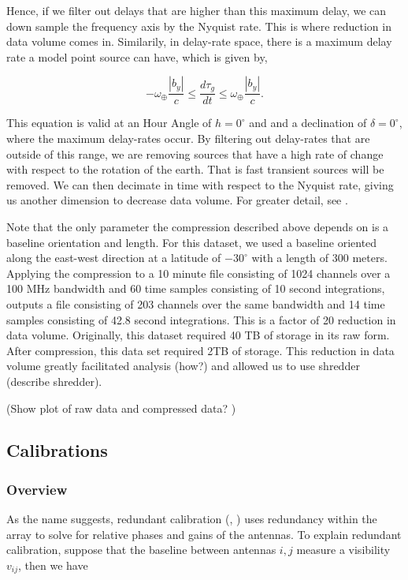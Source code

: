 \documentclass[twocolumn,numberedappendix]{emulateapj}
\begin{document}
Hence, if we filter out delays that are higher than this maximum delay, we can
down sample the frequency axis by the Nyquist rate. This is where reduction in
data volume comes in.  Similarily, in delay-rate space, there is a maximum
delay rate a model point source can have, which is given by, 

\begin{equation}
    -\omega_{\oplus}\frac{|b_{y}|}{c} \leq \frac{d\tau_{g}}{dt} 
                                     \leq \omega_{\oplus}\frac{|b_{y}|}{c}.
\end{equation}

This equation is valid at an Hour Angle of $h = 0^{\circ}$ and and a declination
of $\delta = 0^{\circ}$, where the maximum delay-rates occur. 
By filtering out delay-rates that are outside of this range, we are removing
sources that have a high rate of change with respect to the rotation of the
earth. That is fast transient sources will be removed. We can then decimate in
time with respect to the Nyquist rate, giving us another dimension to decrease
data volume. For greater detail, see \cite{parsons2014a}.

Note that the only parameter the compression described above depends on is a baseline
orientation and length. For this dataset, we used a baseline oriented along the
east-west direction at a latitude of $-30^{\circ}$ with a length of
300 meters.
Applying the compression to a 10 minute file consisting of 1024 channels over a
100 MHz bandwidth and 60 time samples consisting of 
10 second integrations, outputs a file consisting of 203 channels over the same
bandwidth and 14 time samples consisting of 42.8 second integrations. This is a
factor of 20 reduction in data volume. Originally, this dataset required 40 TB
of storage in its raw form. After compression, this data set required 2TB of
storage. This reduction in data volume greatly facilitated analysis (how?) and
allowed us to use shredder (describe shredder).

(Show plot of raw data and compressed data? )


\subsection{Calibrations}
\subsubsection{Overview}
As the name suggests, redundant calibration (\cite{liu_et_al2010},
\cite{zheng_et_al2014}) uses redundancy within the array to solve for relative
phases and gains of the antennas. To explain redundant calibration, suppose that
the baseline between antennas $i,j$ measure a visibility $v_{ij}$, then we have 
\end{document}
